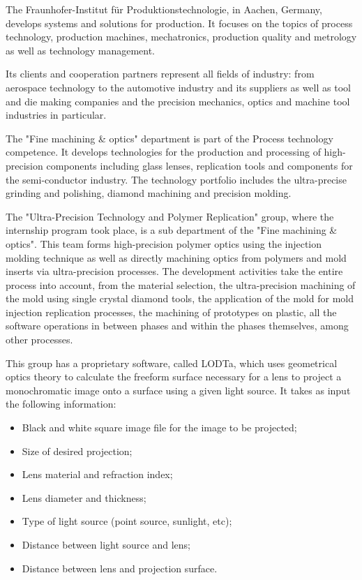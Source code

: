 	The Fraunhofer-Institut f\"ur Produktionstechnologie, in Aachen, Germany, develops systems and solutions for production. It focuses on the topics of process technology, production machines, mechatronics, production quality and metrology as well as technology management.

	Its clients and cooperation partners represent all fields of industry: from aerospace technology to the automotive industry and its suppliers as well as tool and die making companies and the precision mechanics, optics and machine tool industries in particular.
	
	The "Fine machining \& optics" department is part of the Process technology competence. It develops technologies for the production and processing of high-precision components including glass lenses, replication tools and components for the semi-conductor industry. The technology portfolio includes the ultra-precise grinding and polishing, diamond machining and precision molding.
	
	The "Ultra-Precision Technology and Polymer Replication" group, where the internship program took place, is a sub department of the "Fine machining \& optics". This team forms high-precision polymer optics using the injection molding technique as well as directly machining optics from polymers and mold inserts via ultra-precision processes. The development activities take the entire process into account, from the material selection, the ultra-precision machining of the mold using single crystal diamond tools, the application of the mold for mold injection replication processes, the machining of prototypes on plastic, all the software operations in between phases and within the phases themselves, among other processes.
	
	This group has a proprietary software, called LODTa, which uses geometrical optics theory to calculate the freeform surface necessary for a lens to project a monochromatic image onto a surface using a given light source. It takes as input the following information:
	\newpage
	
	\begin{itemize}
		\item Black and white square image file for the image to be projected;
		\item Size of desired projection;
		\item Lens material and refraction index;
		\item Lens diameter and thickness;
		\item Type of light source (point source, sunlight, etc);
		\item Distance between light source and lens;
		\item Distance between lens and projection surface.
	\end{itemize}
	
